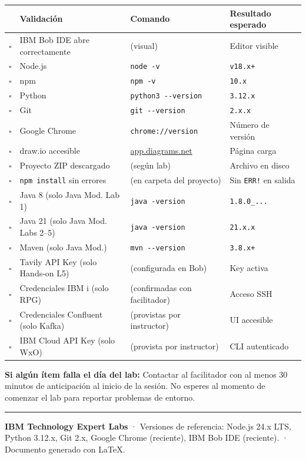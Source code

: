 \documentclass[11pt, a4paper]{article}
\newcommand{\version}[1]{\texttt{\textcolor{ibmblue}{#1}}}
\newcommand{\cmd}[1]{\texttt{\textcolor{ibmdark}{\small #1}}}
\begin{document}
\begin{center}
\begin{tabular}{@{}clll@{}}
\toprule
& \textbf{Validación} & \textbf{Comando} & \textbf{Resultado esperado} \\
\midrule
$\square$ & IBM Bob IDE abre correctamente & (visual) & Editor visible \\
$\square$ & Node.js & \cmd{node -v} & \version{v18.x+} \\
$\square$ & npm & \cmd{npm -v} & \version{10.x} \\
$\square$ & Python & \cmd{python3 -{}-version} & \version{3.12.x} \\
$\square$ & Git & \cmd{git -{}-version} & \version{2.x.x} \\
$\square$ & Google Chrome & \cmd{chrome://version} & Número de versión \\
$\square$ & draw.io accesible & \url{app.diagrams.net} & Página carga \\
$\square$ & Proyecto ZIP descargado & (según lab) & Archivo en disco \\
$\square$ & \cmd{npm install} sin errores & (en carpeta del proyecto) & Sin \texttt{ERR!} en salida \\
$\square$ & Java 8 (solo Java Mod. Lab 1) & \cmd{java -version} & \version{1.8.0\_...} \\
$\square$ & Java 21 (solo Java Mod. Labs 2–5) & \cmd{java -version} & \version{21.x.x} \\
$\square$ & Maven (solo Java Mod.) & \cmd{mvn -{}-version} & \version{3.8.x+} \\
$\square$ & Tavily API Key (solo Hands-on L5) & (configurada en Bob) & Key activa \\
$\square$ & Credenciales IBM i (solo RPG) & (confirmadas con facilitador) & Acceso SSH \\
$\square$ & Credenciales Confluent (solo Kafka) & (provistas por instructor) & UI accesible \\
$\square$ & IBM Cloud API Key (solo WxO) & (provista por instructor) & CLI autenticado \\
\bottomrule
\end{tabular}
\end{center}

\vspace{12pt}
\begin{warningbox}
  \textbf{Si algún ítem falla el día del lab:} Contactar al facilitador con al menos 30 minutos de anticipación al inicio de la sesión. No esperes al momento de comenzar el lab para reportar problemas de entorno.
\end{warningbox}

\vfill
\textcolor{ibmborder}{\rule{\linewidth}{0.5pt}}
{\small\color{ibmgray}
  \textbf{IBM Technology Expert Labs} ·
  Versiones de referencia: Node.js 24.x LTS, Python 3.12.x, Git 2.x, Google Chrome (reciente), IBM Bob IDE (reciente). ·
  Documento generado con \LaTeX.
}
\end{document}
